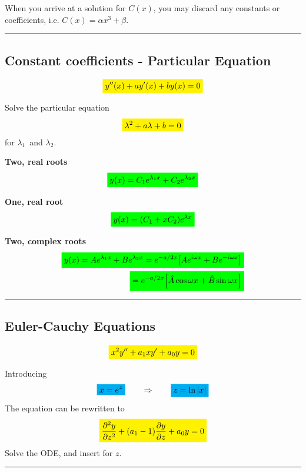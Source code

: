 \documentclass[10pt,a4paper]{article}
\renewcommand{\exp}{e^}
\newcommand{\holine}{\rule{286pt}{1pt}}
\newcommand{\yl}[1]{\colorbox{yellow}{$\displaystyle #1$}}
\newcommand{\gr}[1]{\colorbox{green}{$\displaystyle #1$}}
\newcommand{\bl}[1]{\colorbox{cyan}{$\displaystyle #1$}}
\begin{document}
\begin{multicols}{2}
When you arrive at a solution for $C(x)$, you may discard any constants or coefficients, i.e. $C(x) = \alpha x^3 + \beta$.


\holine
\subsection*{Constant coefficients - Particular Equation}
\[\yl{
    y''(x) + ay'(x) + by(x) = 0
}\]

Solve the particular equation
\[\yl{
    \lambda^2 + a\lambda + b = 0
}\]
for $\lambda_1$ and $\lambda_2$.


\textbf{Two, real roots}
\[\gr{
    y(x) = C_1\exp{\lambda_1 x} + C_2\exp{\lambda_2 x}
}\]


\textbf{One, real root}
\[\gr{
    y(x) = (C_1 + xC_2)\exp{\lambda x}
}\]


\textbf{Two, complex roots}
\begin{equation*}
\begin{split}\gr{
    y(x) = A\exp{\lambda_1 x} + B\exp{\lambda_2 x} = \exp{-a/2 x}\qty[A\exp{i\omega x} + B\exp{-i\omega x}]} \\
    \gr{=\exp{-a/2 x}\qty[\hat{A}\cos{\omega x} + \hat{B}\sin{\omega x}]}
\end{split}
\end{equation*}


\holine
\subsection*{Euler-Cauchy Equations}
\[\yl{
    x^2y'' + a_1x y' + a_0 y = 0
}\]

Introducing
\[
    \bl{x = \exp{z}} \quad\quad\Rightarrow\quad\quad \bl{z = \ln|x|}
\]
The equation can be rewritten to
\[\yl{
    \pdv[2]{y}{z} + (a_1-1)\pdv{y}{z} + a_0 y = 0
}\]
Solve the ODE, and insert for $z$.



\holine

\end{multicols}
\end{document}
